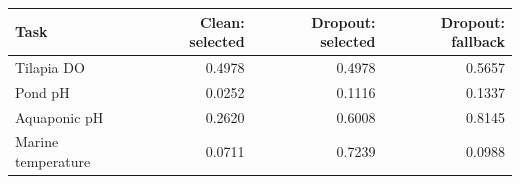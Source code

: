 \begin{tabular}{lrrr}
\toprule
Task & Clean: selected & Dropout: selected & Dropout: fallback \\
\midrule
Tilapia DO & 0.4978 & 0.4978 & 0.5657 \\
Pond pH & 0.0252 & 0.1116 & 0.1337 \\
Aquaponic pH & 0.2620 & 0.6008 & 0.8145 \\
Marine temperature & 0.0711 & 0.7239 & 0.0988 \\
\bottomrule
\end{tabular}
